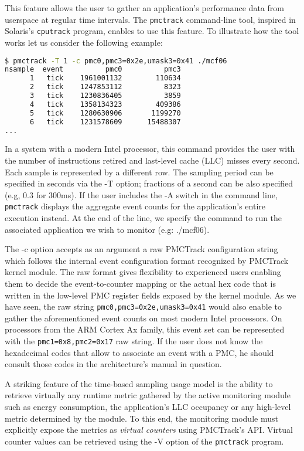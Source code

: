 This feature allows the user to gather an application's performance data
from userspace at regular time intervals. The \texttt{pmctrack}
command-line tool, inspired in Solaris's \texttt{cputrack} program,
enables to use this feature. To illustrate how the tool works let us
consider the following example:

\begin{lstlisting}[language=bash,basicstyle=\tt\scriptsize]
$ pmctrack -T 1 -c pmc0,pmc3=0x2e,umask3=0x41 ./mcf06
nsample  event          pmc0          pmc3
      1   tick    1961001132        110634
      2   tick    1247853112          8323
      3   tick    1230836405          3859
      4   tick    1358134323        409386
      5   tick    1280630906       1199270
      6   tick    1231578609      15488307
...
\end{lstlisting}

In a system with a modern Intel processor, this command provides the
user with the number of instructions retired and last-level cache (LLC)
misses every second. Each sample is represented by a different row. The
sampling period can be specified in seconds via the -T option; fractions
of a second can be also specified (e.g, 0.3 for 300ms). If the user
includes the -A switch in the command line, \texttt{pmctrack} displays
the aggregate event counts for the application's entire execution
instead. At the end of the line, we specify the command to run the
associated application we wish to monitor (e.g: ./mcf06).

The -c option accepts as an argument a raw PMCTrack configuration string
which follows the internal event configuration format recognized by
PMCTrack kernel module. The raw format gives flexibility to experienced
users enabling them to decide the event-to-counter mapping or the actual
hex code that is written in the low-level PMC register fields exposed by
the kernel module. As we have seen, the raw string
\texttt{pmc0,pmc3=0x2e,umask3=0x41} would also enable to gather the
aforementioned event counts on most modern Intel processors. On
processors from the ARM Cortex Ax family, this event set can be
represented with the \texttt{pmc1=0x8,pmc2=0x17} raw string. If the user
does not know the hexadecimal codes that allow to associate an event
with a PMC, he should consult those codes in the architecture's manual
in question.

A striking feature of the time-based sampling usage model is the ability
to retrieve virtually any runtime metric gathered by the active
monitoring module such as energy consumption, the application's LLC
occupancy or any high-level metric determined by the module. To this
end, the monitoring module must explicitly expose the metrics as
\textit{virtual counters} using PMCTrack's API. Virtual counter values
can be retrieved using the -V option of the \texttt{pmctrack} program.


